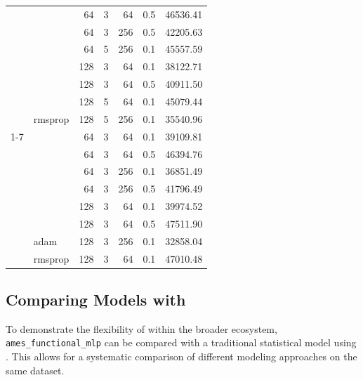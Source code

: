 \begin{table}
\begin{tabular}[t]{rlrrrrr}
 &  & 64 & 3 & 64 & 0.5 & 46536.41\\

 &  & 64 & 3 & 256 & 0.5 & 42205.63\\

 &  & 64 & 5 & 256 & 0.1 & 45557.59\\

 &  & 128 & 3 & 64 & 0.1 & 38122.71\\

 &  & 128 & 3 & 64 & 0.5 & 40911.50\\

 &  & 128 & 5 & 64 & 0.1 & 45079.44\\

\multirow{-21}{*}[\normalbaselineskip]{\raggedleft\arraybackslash 0.01} & \multirow{-8}{*}[\normalbaselineskip]{\raggedright\arraybackslash rmsprop} & 128 & 5 & 256 & 0.1 & 35540.96\\
\cmidrule{1-7}
 &  & 64 & 3 & 64 & 0.1 & 39109.81\\

 &  & 64 & 3 & 64 & 0.5 & 46394.76\\

 &  & 64 & 3 & 256 & 0.1 & 36851.49\\

 &  & 64 & 3 & 256 & 0.5 & 41796.49\\

 &  & 128 & 3 & 64 & 0.1 & 39974.52\\

 &  & 128 & 3 & 64 & 0.5 & 47511.90\\

 & \multirow{-7}{*}[\normalbaselineskip]{\raggedright\arraybackslash adam} & 128 & 3 & 256 & 0.1 & 32858.04\\

\multirow{-8}{*}[\normalbaselineskip]{\raggedleft\arraybackslash 0.05} & rmsprop & 128 & 3 & 64 & 0.1 & 47010.48\\
\bottomrule
\end{tabular}
\end{table}

\subsection{\texorpdfstring{Comparing Models with }{Comparing Models with }}\label{comparing-models-with}

To demonstrate the flexibility of  within the broader  ecosystem, \texttt{ames\_functional\_mlp} can be compared with a traditional statistical model using . This allows for a systematic comparison of different modeling approaches on the same dataset.

